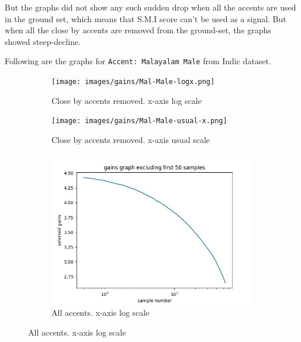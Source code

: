 \documentclass[12pt, a4paper, twoside]{article}
\begin{document}
\begin{itemize}
    But the graphs did not show any such sudden drop when all the accents are used in the ground set, which means that S.M.I score can't be used as a signal. But when all the close by accents are removed from the ground-set, the graphs showed steep-decline.
    
    Following are the graphs for \texttt{Accent: Malayalam Male} from Indic dataset.
    \begin{figure}[h]
      \centering
      \begin{subfigure}[b]{0.4\linewidth}
        \texttt{[image: images/gains/Mal-Male-logx.png]}
        \caption{Close by accents removed. x-axis log scale}
      \end{subfigure}
      \begin{subfigure}[b]{0.4\linewidth}
        \texttt{[image: images/gains/Mal-Male-usual-x.png]}
        \caption{Close by accents removed. x-axis usual scale}
      \end{subfigure}
      
      \begin{subfigure}[b]{0.4\linewidth}
        \includegraphics[width=\linewidth]{images/gains/Mal-Male-all-accents-logx.jpeg}
        \caption{All accents. x-axis log scale}
      \end{subfigure}
    \end{figure}
    
    
\end{itemize}



\newpage
\end{document}
